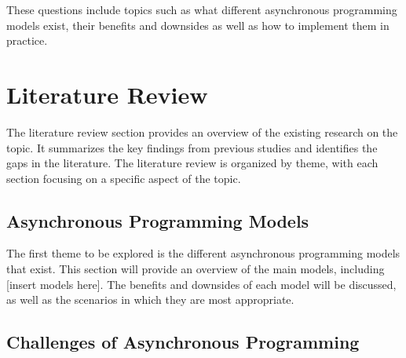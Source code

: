 \documentclass{article}
\begin{document}
These questions include topics such as what different asynchronous programming models exist, their benefits and downsides as well as how to implement them in practice.

\section{Literature Review}

The literature review section provides an overview of the existing research on the topic. It summarizes the key findings from previous studies and identifies the gaps in the literature. The literature review is organized by theme, with each section focusing on a specific aspect of the topic.

\subsection{Asynchronous Programming Models}

The first theme to be explored is the different asynchronous programming models that exist. This section will provide an overview of the main models, including [insert models here]. The benefits and downsides of each model will be discussed, as well as the scenarios in which they are most appropriate.

\subsection{Challenges of Asynchronous Programming}
\end{document}
